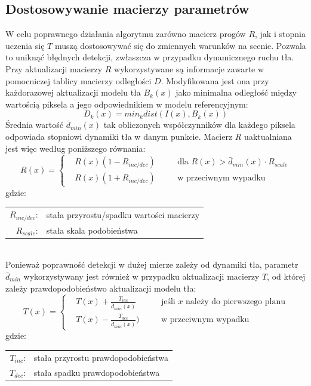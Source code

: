 \subsection{Dostosowywanie macierzy parametrów}
W celu poprawnego działania algorytmu zarówno macierz progów $R$, jak i stopnia uczenia się $T$ muszą dostosowywać się do zmiennych warunków na scenie. Pozwala to uniknąć błędnych detekcji, zwłaszcza w przypadku dynamicznego ruchu tła.\\
Przy aktualizacji macierzy $R$ wykorzystywane są informacje zawarte w pomocniczej tablicy macierzy odległości $D$. Modyfikowana jest ona przy każdorazowej aktualizacji modelu tła $B_{k}(x)$ jako minimalna odległość między wartością piksela a jego odpowiednikiem w modelu referencyjnym:
\begin{equation}
D_{k}(x)=min_{k}dist(I(x),B_{k}(x))
\end{equation}
Średnia wartość $\bar{d}_{min}(x)$ tak obliczonych współczynników dla każdego piksela odpowiada stopniowi dynamiki tła w danym punkcie. Macierz $R$ uaktualniana jest więc według poniższego równania:
\begin{equation}
R(x) = \left\{
\begin{split}
&R(x)(1-R_{inc/dec}) & \quad &\text{dla $R(x)>\bar{d}_{min}(x)\cdot R_{scale}$} \\
&R(x)(1+R_{inc/dec}) & \quad &\text{w przeciwnym wypadku}
\end{split}
\right.
\end{equation}
gdzie:\\ 
\hspace*{3em}
\begin{tabular}{r l}
$R_{inc/dec}$: &  stała przyrostu/spadku wartości macierzy\\
$R_{scale}$: & stała skala podobieństwa
\end{tabular} \\

Ponieważ poprawność detekcji w dużej mierze zależy od dynamiki tła, parametr $\bar{d}_{min}$ wykorzystywany jest również w przypadku aktualizacji macierzy $T$, od której zależy prawdopodobieństwo aktualizacji modelu tła:
\begin{equation}
T(x) = \left\{
\begin{split}
&T(x)+\frac{T_{inc}}{\bar{d}_{min}(x)} & \quad &\text{jeśli $x$ należy do pierwszego planu} \\
&T(x)-\frac{T_{dec}}{\bar{d}_{min}(x)}) & \quad &\text{w przeciwnym wypadku}
\end{split}
\right.
\end{equation}
gdzie:\\ 
\hspace*{3em}
\begin{tabular}{r l}
$T_{inc}$: &  stała przyrostu prawdopodobieństwa\\
$T_{dec}$: & stała spadku prawdopodobieństwa
\end{tabular} \\

